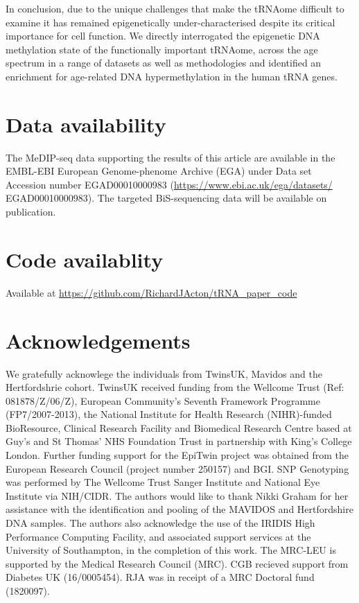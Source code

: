 \documentclass[
]{book}
\begin{document}
In conclusion, due to the unique challenges that make the tRNAome difficult to examine it has remained epigenetically under-characterised despite its critical importance for cell function.
We directly interrogated the epigenetic DNA methylation state of the functionally important tRNAome, across the age spectrum in a range of datasets as well as methodologies and identified an enrichment for age-related DNA hypermethylation in the human tRNA genes.

\newpage

\hypertarget{data-availability}{%
\section{Data availability}\label{data-availability}}

The MeDIP-seq data supporting the results of this article are available in the EMBL-EBI European Genome-phenome Archive (EGA) under Data set Accession number EGAD00010000983 (\url{https://www.ebi.ac.uk/ega/datasets/}
EGAD00010000983).
The targeted BiS-sequencing data will be available on publication.

\hypertarget{code-availablity}{%
\section{Code availablity}\label{code-availablity}}

Available at \url{https://github.com/RichardJActon/tRNA_paper_code}

\newpage

\hypertarget{acknowledgements-1}{%
\section{Acknowledgements}\label{acknowledgements-1}}

We gratefully acknowlege the individuals from TwinsUK, Mavidos and the Hertfordshrie cohort.
TwinsUK received funding from the Wellcome Trust (Ref: 081878/Z/06/Z), European Community's Seventh Framework Programme (FP7/2007-2013), the National Institute for Health Research (NIHR)-funded BioResource, Clinical Research Facility and Biomedical Research Centre based at Guy's and St Thomas' NHS Foundation Trust in partnership with King's College London.
Further funding support for the EpiTwin project was obtained from the European Research Council (project number 250157) and BGI.
SNP Genotyping was performed by The Wellcome Trust Sanger Institute and National Eye Institute via NIH/CIDR.
The authors would like to thank Nikki Graham for her assistance with the identification and pooling of the MAVIDOS and Hertfordshire DNA samples.
The authors also acknowledge the use of the IRIDIS High Performance Computing Facility, and associated support services at the University of Southampton, in the completion of this work.
The MRC-LEU is supported by the Medical Research Council (MRC).
CGB recieved support from Diabetes UK (16/0005454).
RJA was in receipt of a MRC Doctoral fund (1820097).
\end{document}
